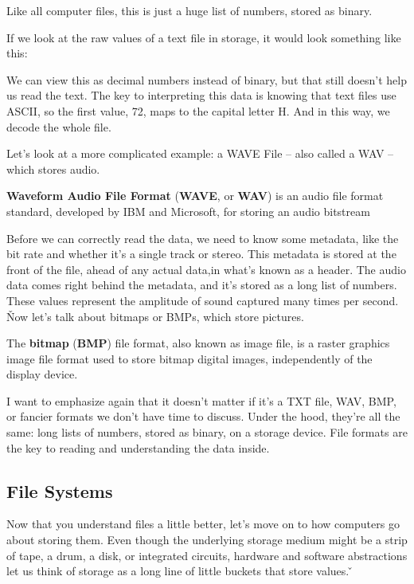 Like all computer files, this is just a huge list of numbers, stored as binary.

\be
If we look at the raw values of a text file in storage, it would look something like this:


We can view this as decimal numbers instead of binary, but that still doesn't help us read the text. The key to
interpreting this data is knowing that text files use ASCII, so the first value, 72, maps to the capital letter H. And
in this way, we decode the whole file.
\ee

Let's look at a more complicated example: a WAVE File – also called a WAV – which stores audio.

\textbf{Waveform Audio File Format} (\textbf{WAVE}, or \textbf{WAV}) is an audio file format standard, developed by
IBM and Microsoft, for storing an audio bitstream
\ed

Before we can correctly read the data, we need to know some metadata, like the bit rate and whether it's a single
track or stereo. This metadata is stored at the front of the file, ahead of any actual data,in what's known as a
header. The audio data comes right behind the metadata, and it's stored as a long list of numbers. These values
represent the amplitude of sound captured many times per second. \v

Now let's talk about bitmaps or BMPs, which store pictures.

The \textbf{bitmap} (\textbf{BMP}) file format, also known as image file, is a raster graphics image file format used
to store bitmap digital images, independently of the display device.
\ed

I want to emphasize again that it doesn't matter if it's a TXT file, WAV, BMP, or fancier formats we don't have time
to discuss. Under the hood, they're all the same: long lists of numbers, stored as binary, on a storage device. File
formats are the key to reading and understanding the data inside.

\subsection{File Systems}

Now that you understand files a little better, let's move on to how computers go about storing them. Even though the
underlying storage medium might be a strip of tape, a drum, a disk, or integrated circuits, hardware and software
abstractions let us think of storage as a long line of little buckets that store values. \v

